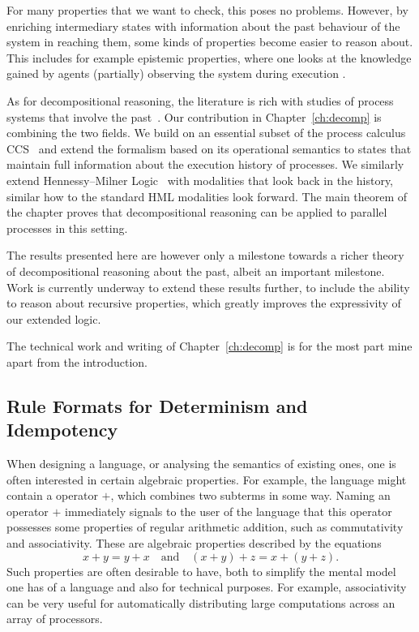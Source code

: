 For many properties that we want to check, this poses no problems. However,
by enriching intermediary states with information about the past behaviour of 
the system in reaching them, some kinds of properties become easier to reason
about. This includes for example epistemic properties, where one looks at the
knowledge gained by agents (partially) observing the system during execution
\cite{Mousavi07-LPAR}.

As for decompositional reasoning, the literature is rich with studies of process systems
that involve the past~\cite{HennessyS85,Phillips06,Laroussinie00,DeNicola:1990}.
Our contribution in Chapter~\ref{ch:decomp} is combining the two fields. We build
on an essential subset of the process calculus CCS~\cite{Milner80} and extend
the formalism based on its operational semantics to states that maintain full
information about the execution history of processes. We similarly extend Hennessy--Milner
Logic~\cite{HennessyM80} with modalities that look back in the history, similar
how to the standard HML modalities look forward. The main theorem of the chapter
proves that decompositional reasoning can be applied to parallel processes in this
setting.

The results presented here are however only a milestone towards a richer theory
of decompositional reasoning about the past, albeit an important milestone. Work
is currently underway to extend these results further, to include the ability to
reason about recursive properties, which greatly improves the expressivity of
our extended logic.

The technical work and writing of Chapter~\ref{ch:decomp} is for the most part
mine apart from the introduction.


\subsection{Rule Formats for Determinism and Idempotency} %

When designing a language, or analysing the semantics of existing ones,
one is often interested in certain algebraic properties. For example, the language
might contain a operator $+$, which combines two subterms in some way. Naming
an operator $+$ immediately signals to the user of the language that this operator
possesses some properties of regular arithmetic addition, such as commutativity
and associativity. These are algebraic properties described by the equations
\[
    x + y = y + x  \quad\textrm{and}\quad (x + y) + z = x + (y + z).
\]
Such properties are often desirable to have, both to simplify the mental model
one has of a language and also for technical purposes. For example, associativity
can be very useful for automatically distributing large computations across an
array of processors.

